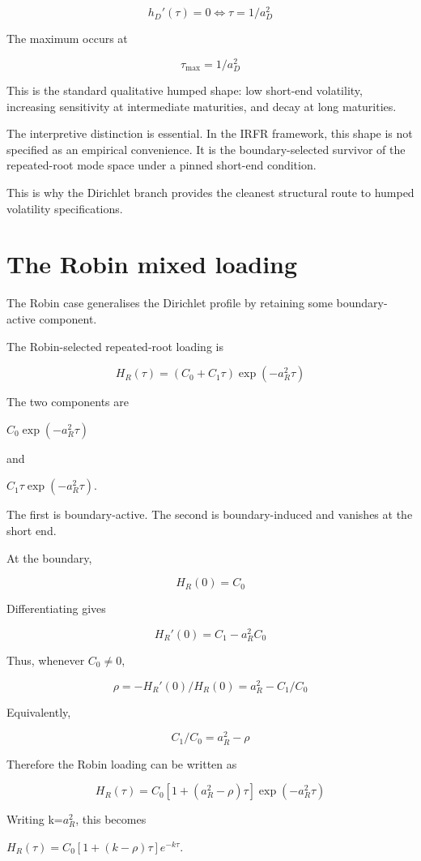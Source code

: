 \documentclass[11pt,oneside]{book}
\begin{document}
\[
h_D'(\tau) = 0 \Leftrightarrow \tau = 1/a_D^2
\]

The maximum occurs at

\[
\tau_{\max} = 1/a_D^2
\]

This is the standard qualitative humped shape: low short-end volatility,
increasing sensitivity at intermediate maturities, and decay at long
maturities.

The interpretive distinction is essential. In the IRFR framework, this
shape is not specified as an empirical convenience. It is the
boundary-selected survivor of the repeated-root mode space under a
pinned short-end condition.

This is why the Dirichlet branch provides the cleanest structural route
to humped volatility specifications.

\section{The Robin mixed loading}\label{the-robin-mixed-loading}

The Robin case generalises the Dirichlet profile by retaining some
boundary-active component.

The Robin-selected repeated-root loading is

\[
H_R(\tau) = (C_0 + C_1\tau) \exp(-a_R^2\tau)
\]

The two components are

$C_0\exp(-a_R^2\tau)$

and

$C_1\tau\exp(-a_R^2\tau)$.

The first is boundary-active. The second is boundary-induced and
vanishes at the short end.

At the boundary,

\[
H_R(0) = C_0
\]

Differentiating gives

\[
H_R'(0) = C_1 - a_R^2 C_0
\]

Thus, whenever $C_0\neq0$,

\[
\rho = -H_R'(0)/H_R(0) = a_R^2 - C_1/C_0
\]

Equivalently,

\[
C_1/C_0 = a_R^2 - \rho
\]

Therefore the Robin loading can be written as

\[
H_R(\tau) = C_0[1 + (a_R^2 - \rho)\tau] \exp(-a_R^2\tau)
\]

Writing k=$a_R^2$, this becomes

$H_R(\tau)=C_0[1+(k-\rho)\tau]e^{-k\tau}$.
\end{document}
